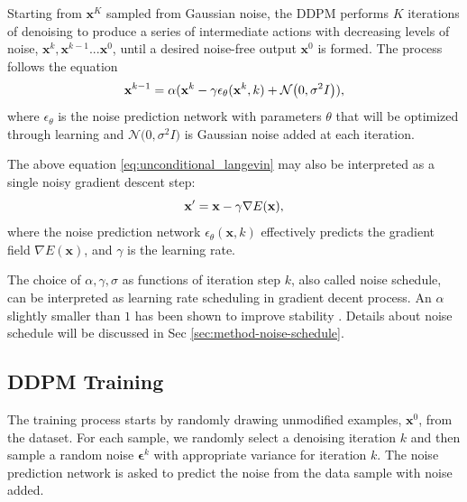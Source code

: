 Starting from $\mathbf{x}^K$ sampled from Gaussian noise, the DDPM performs $K$ iterations of denoising to produce a series of intermediate actions with decreasing levels of noise,
$\mathbf{x}^k, \mathbf{x}^{k-1} ...\mathbf{x}^{0} $, until a desired noise-free output $\mathbf{x}^0$ is formed.  
The process follows the equation
\vspace{-1mm}
\begin{equation}
    \textbf{x}^{k-1}=\alpha(\textbf{x}^{k}-\gamma\epsilon_\theta(\mathbf{x}^k,k) + \mathcal{N} \bigl(0, \sigma^2 I \bigl)),
    \label{eq:unconditional_langevin}
\vspace{-1mm}
\end{equation}
where $\epsilon_\theta$ is the noise prediction network with parameters $\theta$ that will be optimized through learning and $\mathcal{N} \bigl(0, \sigma^2 I \bigl)$ is Gaussian noise added at each iteration. 


The above equation \ref{eq:unconditional_langevin} may also be interpreted as a single noisy gradient descent step: 
\vspace{-2mm}
\begin{equation}
    \mathbf{x}'=\mathbf{x}-\gamma\nabla E(\mathbf{x}),
    \label{eq:gradient_descent}
\vspace{-1mm}
\end{equation}
where the noise prediction network $\epsilon_\theta(\mathbf{x},k)$ effectively predicts the gradient field $\nabla E(\mathbf{x})$, and  $\gamma$ is the learning rate. 

The choice of $\alpha,\gamma,\sigma$ as functions of iteration step $k$, also called noise schedule, can be interpreted as learning rate scheduling in gradient decent process. 
An $\alpha$ slightly smaller than $1$ has been shown to improve stability \cite{ho2020denoising}.
Details about noise schedule will be discussed in Sec \ref{sec:method-noise-schedule}.





\subsection{DDPM Training} 
\label{sec:ddpm_inference}


The training process starts by randomly drawing unmodified examples, $\mathbf{x}^0$, from the dataset. For each sample, we randomly select a denoising iteration $k$ and then sample a random noise $\mathbf{\epsilon}^k$ with appropriate variance for iteration $k$. The noise prediction network is asked to predict the noise from the data sample with noise added.


